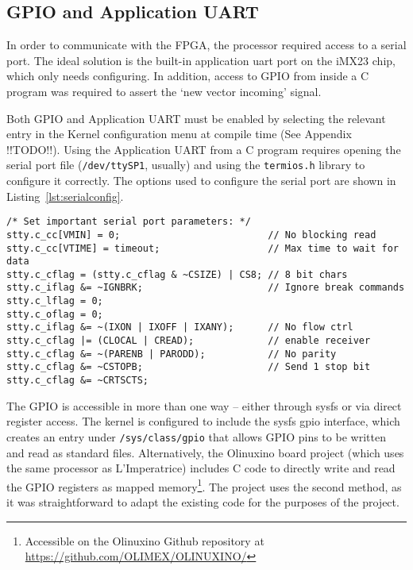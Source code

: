 	\subsection{GPIO and Application UART} %
	\label{sub:gpio_application_uart}
		In order to communicate with the FPGA, the processor required access to a serial port.  The ideal solution is the built-in application uart port on the iMX23 chip, which only needs configuring.  In addition, access to GPIO from inside a C program was required to assert the `new vector incoming' signal.

		Both GPIO and Application UART must be enabled by selecting the relevant entry in the Kernel configuration menu at compile time (See Appendix !!TODO!!).  Using the Application UART from a C program requires opening the serial port file (\texttt{/dev/ttySP1}, usually) and using the \texttt{termios.h} library to configure it correctly.  The options used to configure the serial port are shown in Listing~\ref{lst:serialconfig}.

\begin{lstlisting}[style=customc, label=lst:serialconfig, caption=Serial Port Configuration]
/* Set important serial port parameters: */
stty.c_cc[VMIN] = 0;                          // No blocking read
stty.c_cc[VTIME] = timeout;                   // Max time to wait for data
stty.c_cflag = (stty.c_cflag & ~CSIZE) | CS8; // 8 bit chars
stty.c_iflag &= ~IGNBRK;                      // Ignore break commands
stty.c_lflag = 0;
stty.c_oflag = 0;
stty.c_iflag &= ~(IXON | IXOFF | IXANY);      // No flow ctrl
stty.c_cflag |= (CLOCAL | CREAD);             // enable receiver
stty.c_cflag &= ~(PARENB | PARODD);           // No parity
stty.c_cflag &= ~CSTOPB;                      // Send 1 stop bit
stty.c_cflag &= ~CRTSCTS;
\end{lstlisting}

		The GPIO is accessible in more than one way -- either through sysfs or via direct register access.  The kernel is configured to include the sysfs gpio interface, which creates an entry under \texttt{/sys/class/gpio} that allows GPIO pins to be written and read as standard files.  Alternatively, the Olinuxino board project (which uses the same processor as L'Imperatrice) includes C code to directly write and read the GPIO registers as mapped memory\footnote{Accessible on the Olinuxino Github repository at \href{https://github.com/OLIMEX/OLINUXINO/}{https://github.com/OLIMEX/OLINUXINO/}}.  The project uses the second method, as it was straightforward to adapt the existing code for the purposes of the project.  %

